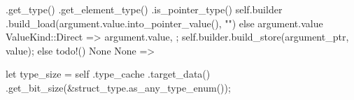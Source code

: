 \documentclass[
  oneside,
  english,
  coorientadorbanca,
  noabntexcite
]{ufsc-thesis-rn46-2019}
\begin{document}
\begin{rustcode}
{{{{{{{{{{                                            .get_type()
                                            .get_element_type()
                                            .is_pointer_type()
                                        {
                                            self.builder
                                                .build_load(argument.value.into_pointer_value(), "")
                                        } else {
                                            argument.value
                                        }
                                    }
                                    ValueKind::Direct => argument.value,
                                };
                                self.builder.build_store(argument_ptr, value);
                            }
                        } else {
                            todo!()
                        }
                        None
                    }
                    None => {
                        let type_size = self
                            .type_cache
                            .target_data()
                            .get_bit_size(&struct_type.as_any_type_enum());

}}}}}}
\end{rustcode}
\end{document}

